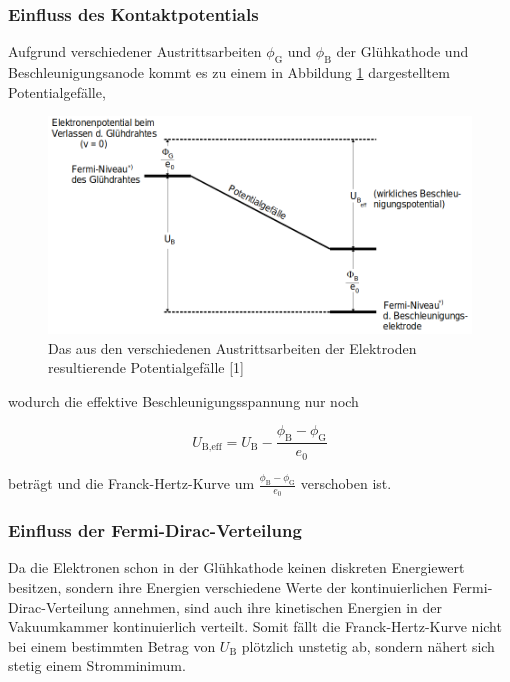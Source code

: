 \subsubsection{Einfluss des Kontaktpotentials}

Aufgrund verschiedener Austrittsarbeiten $\phi_\text{G}$ und $\phi_\text{B}$ der Glühkathode 
und Beschleunigungsanode kommt es zu einem in Abbildung \ref{fig:bild3} dargestelltem Potentialgefälle,

\begin{figure} [H]
    \centering
    \includegraphics[scale=0.4]{content/bild3.png}
    \caption{Das aus den verschiedenen Austrittsarbeiten der Elektroden resultierende Potentialgefälle [1]}
    \label{fig:bild3}
  \end{figure}

wodurch die effektive Beschleunigungsspannung nur noch

\begin{equation}
    U_\text{B,eff} = U_\text{B} - \frac{\phi_\text{B} - \phi_\text{G}}{e_0}
\end{equation}

beträgt und die Franck-Hertz-Kurve um $\frac{\phi_\text{B} - \phi_\text{G}}{e_0}$ verschoben ist.

\subsubsection{Einfluss der Fermi-Dirac-Verteilung}

Da die Elektronen schon in der Glühkathode keinen diskreten Energiewert besitzen, sondern
ihre Energien verschiedene Werte der kontinuierlichen Fermi-Dirac-Verteilung annehmen,
sind auch ihre kinetischen Energien in der Vakuumkammer kontinuierlich verteilt.
Somit fällt die Franck-Hertz-Kurve nicht bei einem bestimmten Betrag von $U_\text{B}$ plötzlich
unstetig ab, sondern nähert sich stetig einem Stromminimum.

